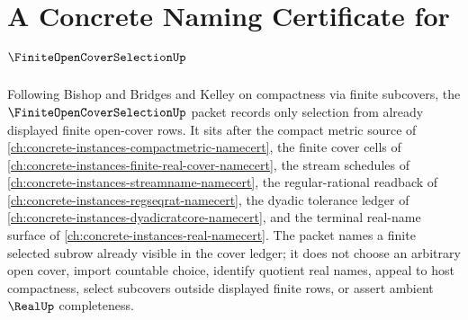 \chapter{A Concrete Naming Certificate for $\FiniteOpenCoverSelectionUp$}
\label{ch:concrete-instances-finite-open-cover-selection-namecert}

Following Bishop and Bridges and Kelley on compactness via finite subcovers, the $\FiniteOpenCoverSelectionUp$ packet records only selection from already displayed finite open-cover rows. It sits after the compact metric source of \autoref{ch:concrete-instances-compactmetric-namecert}, the finite cover cells of \autoref{ch:concrete-instances-finite-real-cover-namecert}, the stream schedules of \autoref{ch:concrete-instances-streamname-namecert}, the regular-rational readback of \autoref{ch:concrete-instances-regseqrat-namecert}, the dyadic tolerance ledger of \autoref{ch:concrete-instances-dyadicratcore-namecert}, and the terminal real-name surface of \autoref{ch:concrete-instances-real-namecert}. The packet names a finite selected subrow already visible in the cover ledger; it does not choose an arbitrary open cover, import countable choice, identify quotient real names, appeal to host compactness, select subcovers outside displayed finite rows, or assert ambient $\RealUp$ completeness.

